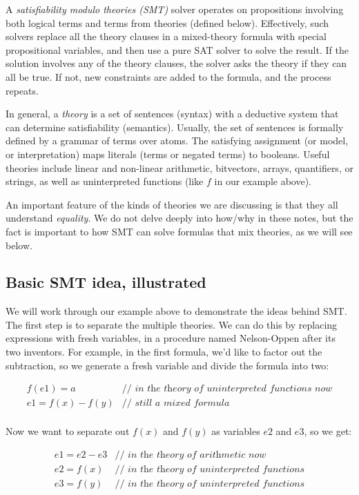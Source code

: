 \documentclass[11pt]{article}
\begin{document}
A \emph{satisfiability modulo theories (SMT)} solver operates on propositions
involving both logical terms and terms from theories (defined below).
Effectively, such solvers replace all the theory clauses in a mixed-theory
formula with special propositional variables, and then use a pure SAT solver to
solve the result. If the solution involves any of the theory clauses, the solver
asks the theory if they can all be true. If not, new constraints are added to
the formula, and the process repeats.

In general, a \emph{theory} is a set of sentences (syntax) with a deductive
system that can determine satisfiability (semantics). Usually, the set of
sentences is formally defined by a grammar of terms over atoms. The satisfying
assignment (or model, or interpretation) maps literals (terms or negated terms)
to booleans.  Useful theories include linear and non-linear arithmetic,
bitvectors, arrays, quantifiers, or strings, as well as uninterpreted functions
(like $f$ in our example above).

An important feature of the kinds of theories we are discussing is that they all
understand \emph{equality}. We do not delve deeply into how/why in these notes,
but the fact is important to how SMT can solve formulas that mix theories, as we
will see below.

\subsection{Basic SMT idea, illustrated}

We will work through our example above to demonstrate the ideas behind SMT. The
first step is to separate the multiple theories. We can do this by replacing
expressions with fresh variables, in a procedure named Nelson-Oppen after its
two inventors. For example, in the first formula, we'd like to factor out the
subtraction, so we generate a fresh variable and divide the formula into two:

\[
\begin{array}{ll}
f(e1) = a       & \textit{// in the theory of uninterpreted functions now} \\
e1 = f(x)-f(y)  & \textit{// still a mixed formula} \\
\end{array}
\]

Now we want to separate out $f(x)$ and $f(y)$ as variables $e2$ and $e3$, so we get:

\[
\begin{array}{ll}
e1 = e2 - e3    & \textit{// in the theory of arithmetic now} \\
e2 = f(x)       & \textit{// in the theory of uninterpreted functions} \\
e3 = f(y)       & \textit{// in the theory of uninterpreted functions} \\
\end{array}
\]
\end{document}
